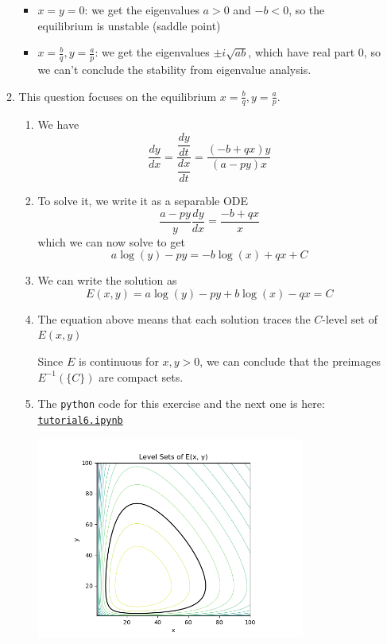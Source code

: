 \begin{enumerate}
\begin{enumerate}
	\begin{itemize}
		\item $x=y=0$: we get the eigenvalues $a>0$ and $-b<0$, so the equilibrium is unstable (saddle point)
		\item $x=\frac{b}{q}, y = \frac{a}{p}$: we get the eigenvalues $\pm i \sqrt{ab}$, which have real part 0, so we can't conclude the stability from eigenvalue analysis.
	\end{itemize}
	
	
	\item This question focuses on the equilibrium $x=\frac{b}{q}, y = \frac{a}{p}$.
	
	\begin{enumerate}
		\item We have
		\[
			\frac{dy}{dx} 
				= \frac{\dfrac{dy}{dt}}{\dfrac{dx}{dt}}
				= \frac{(-b + qx)y}{(a-py)x}
		\]
		
		\item To solve it, we write it as a separable ODE
		\[
			\frac{a-py}{y} \frac{dy}{dx} = \frac{-b+qx}{x}
		\]
		which we can now solve to get
		\[
		a\log(y) - py = -b\log(x) + qx + C
		\]
		
		\item We can write the solution as
		\[
		E(x,y) = a\log(y) - py +b\log(x) - qx = C
		\]
		
		\item The equation above means that each solution traces the $C$-level set of $E(x,y)$
		
		Since $E$ is continuous for $x,y>0$, we can conclude that the preimages $E^{-1}(\{C\})$ are compact sets.
		
		\item The \verb|python| code for this exercise and the next one is here: \href{https://utoronto.syzygy.ca/jupyter/user-redirect/git-pull?repo=https://github.com/bigfatbernie/IBLMathModeling&subPath=tutorials/tutorial6/tutorial6.ipynb}{\tt tutorial6.ipynb}
		\begin{center}
		\includegraphics[width=250pt]{LV-levelsets.png}	
		\end{center}


\end{enumerate}
\end{enumerate}
\end{enumerate}
